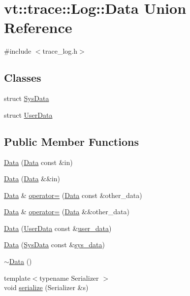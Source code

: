 \hypertarget{unionvt_1_1trace_1_1_log_1_1_data}{}\section{vt\+:\+:trace\+:\+:Log\+:\+:Data Union Reference}
\label{unionvt_1_1trace_1_1_log_1_1_data}


{\ttfamily \#include $<$trace\+\_\+log.\+h$>$}

\subsection*{Classes}
\begin{DoxyCompactItemize}
\item 
struct \hyperlink{structvt_1_1trace_1_1_log_1_1_data_1_1_sys_data}{Sys\+Data}
\item 
struct \hyperlink{structvt_1_1trace_1_1_log_1_1_data_1_1_user_data}{User\+Data}
\end{DoxyCompactItemize}
\subsection*{Public Member Functions}
\begin{DoxyCompactItemize}
\item 
\hyperlink{unionvt_1_1trace_1_1_log_1_1_data_aa391f018a8b00d5d9d5083ff3f846fcd}{Data} (\hyperlink{unionvt_1_1trace_1_1_log_1_1_data}{Data} const \&in)
\item 
\hyperlink{unionvt_1_1trace_1_1_log_1_1_data_afd6d8af98a0fc51666b55dabe8460d0c}{Data} (\hyperlink{unionvt_1_1trace_1_1_log_1_1_data}{Data} \&\&in)
\item 
\hyperlink{unionvt_1_1trace_1_1_log_1_1_data}{Data} \& \hyperlink{unionvt_1_1trace_1_1_log_1_1_data_a9a3cab1f1e1983d77f9a7766aa464cf6}{operator=} (\hyperlink{unionvt_1_1trace_1_1_log_1_1_data}{Data} const \&other\+\_\+data)
\item 
\hyperlink{unionvt_1_1trace_1_1_log_1_1_data}{Data} \& \hyperlink{unionvt_1_1trace_1_1_log_1_1_data_a6f90113c26e6b4c60ce2159dab367356}{operator=} (\hyperlink{unionvt_1_1trace_1_1_log_1_1_data}{Data} \&\&other\+\_\+data)
\item 
\hyperlink{unionvt_1_1trace_1_1_log_1_1_data_aa76f0f5895f20a4b607e2666b2ad944e}{Data} (\hyperlink{structvt_1_1trace_1_1_log_1_1_data_1_1_user_data}{User\+Data} const \&\hyperlink{structvt_1_1trace_1_1_log_a7b251bc7dcebcbbafa29cc2ca6ea4c12}{user\+\_\+data})
\item 
\hyperlink{unionvt_1_1trace_1_1_log_1_1_data_ae94b837f6aa6d25ad87df4b05f089ed9}{Data} (\hyperlink{structvt_1_1trace_1_1_log_1_1_data_1_1_sys_data}{Sys\+Data} const \&\hyperlink{structvt_1_1trace_1_1_log_a082937c397ac5b47ffc9089ff94698f0}{sys\+\_\+data})
\item 
\hyperlink{unionvt_1_1trace_1_1_log_1_1_data_a756ed898d9a1df126b2e214050f158e1}{$\sim$\+Data} ()
\item 
{\footnotesize template$<$typename Serializer $>$ }\\void \hyperlink{unionvt_1_1trace_1_1_log_1_1_data_a6294cc8c3671c89e79934415b1642578}{serialize} (Serializer \&s)
\end{DoxyCompactItemize}
